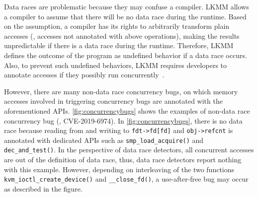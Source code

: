 Data races are problematic because they may confuse a compiler.  LKMM
allows a compiler to assume that there will be no data race during the
runtime. Based on the assumption, a compiler has its rights to
arbitrarily transform plain accesses (\ie, accesses not annotated with
above operations), making the results unpredictable if there is a data
race during the runtime.
%
Therefore, LKMM defines the outcome of the program as undefined
behavior if a data race occurs.
%
Also, to prevent such undefined behaviors, LKMM requires developers to
annotate accesses if they possibly run
concurrently~\cite{data-race-fix1, data-race-fix2, data-race-fix3}.





%
%
However, there are many non-data race concurrency bugs, on which
memory accesses involved in triggering concurrency bugs are annotated
with the aforementioned APIs.
%
\autoref{fig:concurrencybugs} shows the examples of non-data race
concurrency bug (\ie, CVE-2019-6974).
%
In \autoref{fig:concurrencybugs}, there is no data race because
reading from and writing to \texttt{fdt->fd[fd]} and
\texttt{obj->refcnt} is annotated with dedicated APIs such as
\texttt{smp_load_acquire()} and \texttt{dec_and_test()}.
%
In the perspective of data race detectors, all concurrent accesses are
out of the definition of data race, thus, data race detectors report
nothing with this example.
%
However, depending on interleaving of the two functions
\texttt{kvm_ioctl_create_device()} and \texttt{__close_fd()}, a
use-after-free bug may occur as described in the figure.



